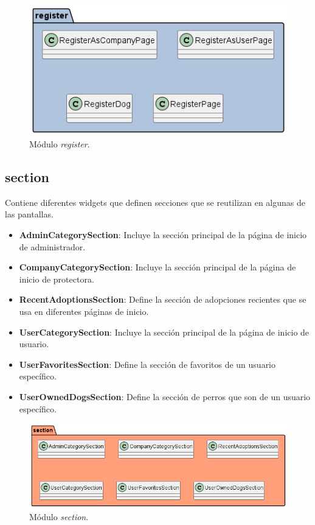 \documentclass[a4paper, 12pt]{article}
\begin{document}
\begin{figure}[H]
	\begin{center}
		{\includegraphics[width=0.8\linewidth]{diagram/Register.png}\par}
		\caption{Módulo  \textit{register}.}
	\end{center}
\end{figure}

\subsection*{section}

Contiene diferentes widgets que definen secciones que se reutilizan en algunas de las pantallas.

\begin{itemize}[noitemsep]
	\item \textbf{AdminCategorySection}: Incluye la sección principal de la página de inicio de administrador.
	\item \textbf{CompanyCategorySection}: Incluye la sección principal de la página de inicio de protectora.
	\item \textbf{RecentAdoptionsSection}:  Define la sección de adopciones recientes que se usa en diferentes páginas de inicio.
	\item \textbf{UserCategorySection}:  Incluye la sección principal de la página de inicio de usuario.
	\item \textbf{UserFavoritesSection}:  Define la sección de favoritos de un usuario específico.
	\item \textbf{UserOwnedDogsSection}:  Define la sección de perros que son de un usuario específico.
\end{itemize}


\begin{figure}[H]
	\begin{center}
		{\includegraphics[width=0.8\linewidth]{diagram/Section.png}\par}
		\caption{Módulo  \textit{section}.}
	\end{center}
\end{figure}
\end{document}
